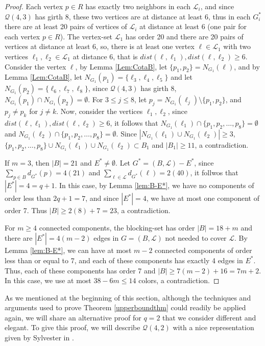 \documentclass[12pt]{article}
\begin{document}
\begin{proof}
    Each vertex $p\in R$ has exactly two neighbors in each $\mathcal{L}_i$, and since $\mathcal{Q}(4,3)$ has girth 8, these two vertices are at distance at least 6, thus in each $G^*_i$ there are at least 20 pairs of vertices of ${\mathcal{L}_i}$ at distance at least 6 (one pair for each vertex $p\in R$). 
    The vertex-set ${\mathcal{L}_1}$ has order 20 and there are 20 pairs of vertices at distance at least 6, so, there is at least one vertex  $\ell\in\mathcal{L}_1$ with two vertices $\ell_1,\ell_2\in{\mathcal{L}_1}$ at distance 6, that is $dist(\ell,\ell_1),dist(\ell,\ell_2)\ge6$.  
    Consider the vertex $\ell$, by Lemma \ref{Lem:CotaB}, let $\{p_1,p_2\}=N_{G_1}(\ell)$, and by Lemma \ref{Lem:CotaB}, let $N_{G_1}(p_1)=\{\ell_3,\ell_4,\ell_5\}$ and let $N_{G_1}(p_2)=\{\ell_6,\ell_7,\ell_8\}$, since $\mathcal{Q}(4,3)$ has girth 8, $N_{G_1}(p_1)\cap N_{G_1}(p_2)=\emptyset$. For $3\le j\le8$, let $p_j=N_{G_1}(\ell_j)\setminus\{p_1,p_2\}$, and  $p_j\neq p_k$ for $j\neq k$. 
    Now, consider the vertices $\ell_1,\ell_2$, since $dist(\ell,\ell_1),dist(\ell,\ell_2)\ge6$, it follows that $N_{G_1}(\ell_1)\cap\{p_1,p_2,\dots,p_8\}=\emptyset$ and $N_{G_1}(\ell_2)\cap\{p_1,p_2,\dots,p_8\}=\emptyset$. Since $|N_{G_1}(\ell_1)\cup N_{G_1}(\ell_2)|\ge3$, $\{p_1,p_2,\dots,p_8\}\cup N_{G_1}(\ell_1)\cup N_{G_1}(\ell_2)\subset B_1$ and $|B_1|\ge11$, a contradiction.
    
    If $m=3$, then $|B|=21$ and $E^*\neq\emptyset$. Let $G^*=(B,\mathcal{L})-E^*$, since $\sum_{p\in B}d_{G^*}(p)=4(21)$ and $\sum_{\ell\in \mathcal{L}}d_{G^*}(\ell)=2(40)$, it follwos that $|E^*|=4=q+1$. In this case, by Lemma \ref{lem:B-E*}, we have no components of order less than $2q+1=7$, and since $|E^*|=4$, we have at most one component of order 7. 
    Thus $|B|\ge2(8)+7=23$, a contradiction.
    
    For $m\ge4$ connected components, the blocking-set has order $|B| = 18+ m $ and there are $|E^*|=4(m-2)$ edges in $G=(B,\mathcal{L})$ not needed to cover $\mathcal{L}$. By Lemma \ref{lem:B-E*}, we can have at most  $m-2$ connected components of order less than or equal to 7, and each of these components has exactly 4 edges in $E^*$. Thus, each of these components has order 7 and $|B|\ge 7(m-2)+16=7m+2$. In this case, we use at most $38-6m\le 14$ colors, a contradiction.
\end{proof}

As we {mentioned at the beginning} of this section, although the techniques and arguments used to prove Theorem \ref{upperboundthm} could readily be applied again, we will share an alternative proof for $q=2$ that we consider different and elegant. 
To give this proof, we will describe $\mathcal{Q}(4,2)$ with a nice representation given by Sylvester in \cite{sylvester}. 
\end{document}
